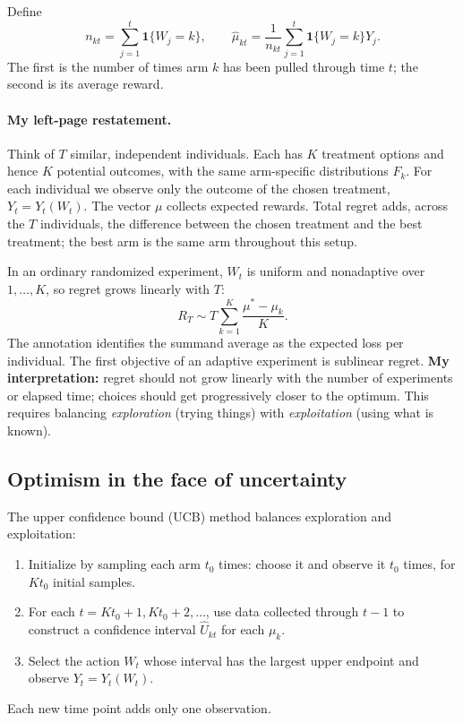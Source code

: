 Define
\[
 n_{kt}=\sum_{j=1}^t\mathbf1\{W_j=k\},\qquad
 \widehat\mu_{kt}=\frac1{n_{kt}}\sum_{j=1}^t\mathbf1\{W_j=k\}Y_j.
\]
The first is the number of times arm $k$ has been pulled through time $t$; the second is its average reward.

\paragraph{My left-page restatement.}
Think of $T$ similar, independent individuals. Each has $K$ treatment options and hence $K$ potential outcomes, with the same arm-specific distributions $F_k$. For each individual we observe only the outcome of the chosen treatment, $Y_t=Y_t(W_t)$. The vector $\mu$ collects expected rewards. Total regret adds, across the $T$ individuals, the difference between the chosen treatment and the best treatment; the best arm is the same arm throughout this setup.

In an ordinary randomized experiment, $W_t$ is uniform and nonadaptive over $1,\ldots,K$, so regret grows linearly with $T$:
\[
 R_T\sim T\sum_{k=1}^K\frac{\mu^*-\mu_k}{K}.
\]
The annotation identifies the summand average as the expected loss per individual. The first objective of an adaptive experiment is sublinear regret. \textbf{My interpretation:} regret should not grow linearly with the number of experiments or elapsed time; choices should get progressively closer to the optimum. This requires balancing \emph{exploration} (trying things) with \emph{exploitation} (using what is known).

\subsection{Optimism in the face of uncertainty}
The upper confidence bound (UCB) method balances exploration and exploitation:
\begin{enumerate}
 \item Initialize by sampling each arm $t_0$ times: choose it and observe it $t_0$ times, for $Kt_0$ initial samples.
 \item For each $t=Kt_0+1,Kt_0+2,\ldots$, use data collected through $t-1$ to construct a confidence interval $\widehat U_{kt}$ for each $\mu_k$.
 \item Select the action $W_t$ whose interval has the largest upper endpoint and observe $Y_t=Y_t(W_t)$.
\end{enumerate}
Each new time point adds only one observation.

